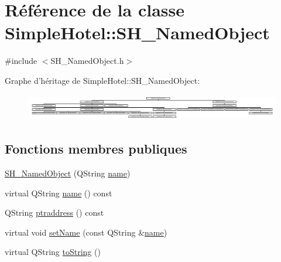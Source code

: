 \hypertarget{classSimpleHotel_1_1SH__NamedObject}{\section{Référence de la classe Simple\-Hotel\-:\-:S\-H\-\_\-\-Named\-Object}
\label{classSimpleHotel_1_1SH__NamedObject}
}


{\ttfamily \#include $<$S\-H\-\_\-\-Named\-Object.\-h$>$}

Graphe d'héritage de Simple\-Hotel\-:\-:S\-H\-\_\-\-Named\-Object\-:\begin{figure}[H]
\begin{center}
\leavevmode
\includegraphics[height=1.158621cm]{classSimpleHotel_1_1SH__NamedObject}
\end{center}
\end{figure}
\subsection*{Fonctions membres publiques}
\begin{DoxyCompactItemize}
\item 
\hyperlink{classSimpleHotel_1_1SH__NamedObject_ab4b7b2eb7ca4ccae032420739a455c20}{S\-H\-\_\-\-Named\-Object} (Q\-String \hyperlink{classSimpleHotel_1_1SH__NamedObject_ad144716345034c91cface8f3163a799e}{name})
\item 
virtual Q\-String \hyperlink{classSimpleHotel_1_1SH__NamedObject_ad144716345034c91cface8f3163a799e}{name} () const 
\item 
Q\-String \hyperlink{classSimpleHotel_1_1SH__NamedObject_af64f64d8af4f899c0626974bbf15698c}{ptraddress} () const 
\item 
virtual void \hyperlink{classSimpleHotel_1_1SH__NamedObject_a1e11501093109612bb85ea24a1eba7cb}{set\-Name} (const Q\-String \&\hyperlink{classSimpleHotel_1_1SH__NamedObject_ad144716345034c91cface8f3163a799e}{name})
\item 
virtual Q\-String \hyperlink{classSimpleHotel_1_1SH__NamedObject_ab6e289aeff50c3fb0f30156c68b1e808}{to\-String} ()
\end{DoxyCompactItemize}

